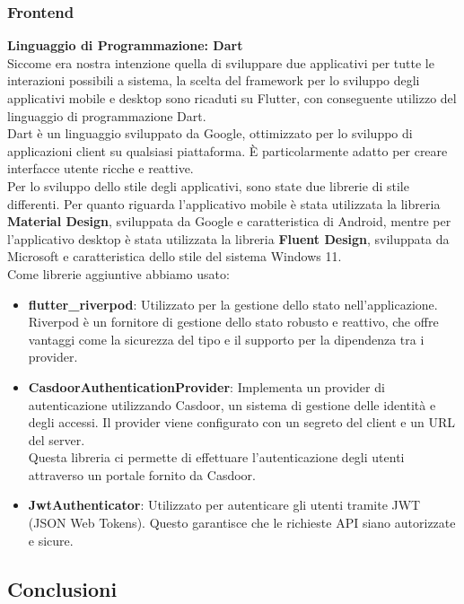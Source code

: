 \documentclass{article}
\begin{document}
\subsubsection{Frontend}
\textbf{Linguaggio di Programmazione: Dart}\\
Siccome era nostra intenzione quella di sviluppare due applicativi per tutte le interazioni possibili a sistema, la scelta del framework per lo sviluppo degli applicativi mobile e desktop sono ricaduti su Flutter, con conseguente utilizzo del linguaggio di programmazione Dart.\\
 Dart è un linguaggio sviluppato da Google, ottimizzato per lo sviluppo di applicazioni client su qualsiasi piattaforma. È particolarmente adatto per creare interfacce utente ricche e reattive.\\
Per lo sviluppo dello stile degli applicativi, sono state due librerie di stile differenti. Per quanto riguarda l'applicativo mobile è stata utilizzata la libreria \textbf{Material Design}, sviluppata da Google e caratteristica di Android, mentre per l'applicativo desktop è stata utilizzata la libreria \textbf{Fluent Design}, sviluppata da Microsoft e caratteristica dello stile del sistema Windows 11.\\
Come librerie aggiuntive abbiamo usato:
\begin{itemize}
    \item \textbf{flutter\_riverpod}: Utilizzato per la gestione dello stato nell'applicazione. Riverpod è un fornitore di gestione dello stato robusto e reattivo, che offre vantaggi come la sicurezza del tipo e il supporto per la dipendenza tra i provider.
    \item \textbf{CasdoorAuthenticationProvider}: Implementa un provider di autenticazione utilizzando Casdoor, un sistema di gestione delle identità e degli accessi. Il provider viene configurato con un segreto del client e un URL del server. \\
    Questa libreria ci permette di effettuare l'autenticazione degli utenti attraverso un portale fornito da Casdoor. 
    \item \textbf{JwtAuthenticator}: Utilizzato per autenticare gli utenti tramite JWT (JSON Web Tokens). Questo garantisce che le richieste API siano autorizzate e sicure.
\end{itemize}

\clearpage

\subsection{Conclusioni}
\end{document}
